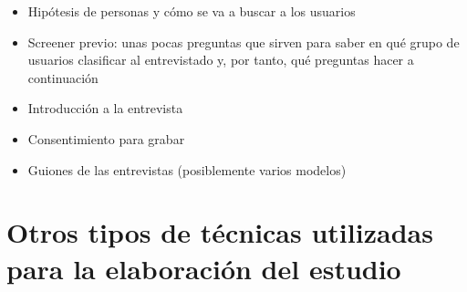 \begin{itemize}
    \item Hipótesis de personas y cómo se va a buscar a los usuarios
    \item Screener previo: unas pocas preguntas que sirven para saber en qué grupo de usuarios clasificar al entrevistado y, por tanto, qué preguntas hacer a continuación
    \item Introducción a la entrevista
    \item Consentimiento para grabar
    \item Guiones de las entrevistas (posiblemente varios modelos)
\end{itemize}

\section{Otros tipos de técnicas utilizadas para la elaboración del estudio}